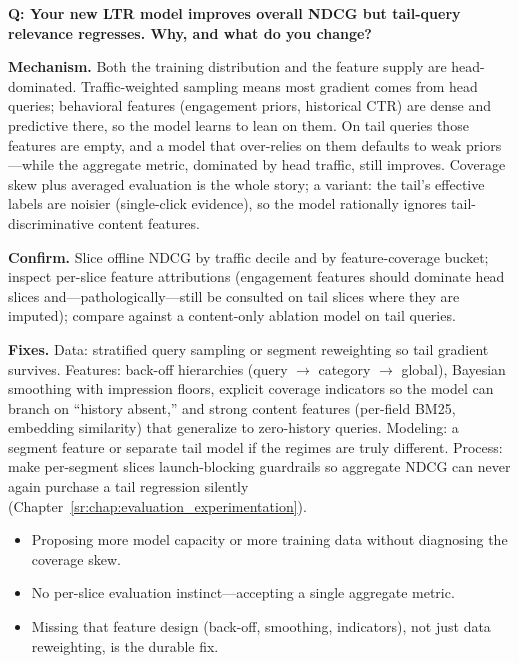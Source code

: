 \begin{interviewq}
\textbf{Q: Your new LTR model improves overall NDCG but tail-query relevance regresses. Why, and what do you change?}

 \quad {} \quad \badgefreq{\freqmed}

\stronganswer

\textbf{Mechanism.} Both the training distribution and the feature supply are head-dominated. Traffic-weighted sampling means most gradient comes from head queries; behavioral features (engagement priors, historical CTR) are dense and predictive there, so the model learns to lean on them. On tail queries those features are empty, and a model that over-relies on them defaults to weak priors---while the aggregate metric, dominated by head traffic, still improves. Coverage skew plus averaged evaluation is the whole story; a variant: the tail's effective labels are noisier (single-click evidence), so the model rationally ignores tail-discriminative content features.

\textbf{Confirm.} Slice offline NDCG by traffic decile and by feature-coverage bucket; inspect per-slice feature attributions (engagement features should dominate head slices and---pathologically---still be consulted on tail slices where they are imputed); compare against a content-only ablation model on tail queries.

\textbf{Fixes.} Data: stratified query sampling or segment reweighting so tail gradient survives. Features: back-off hierarchies (query $\rightarrow$ category $\rightarrow$ global), Bayesian smoothing with impression floors, explicit coverage indicators so the model can branch on ``history absent,'' and strong content features (per-field BM25, embedding similarity) that generalize to zero-history queries. Modeling: a segment feature or separate tail model if the regimes are truly different. Process: make per-segment slices launch-blocking guardrails so aggregate NDCG can never again purchase a tail regression silently (Chapter~\ref{sr:chap:evaluation_experimentation}).

\redflags
\begin{itemize}
    \item Proposing more model capacity or more training data without diagnosing the coverage skew.
    \item No per-slice evaluation instinct---accepting a single aggregate metric.
    \item Missing that feature design (back-off, smoothing, indicators), not just data reweighting, is the durable fix.
\end{itemize}


\end{interviewq}
